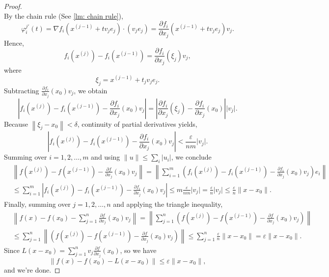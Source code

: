\begin{proof}
\[    \]   
    By the chain rule (See \autoref{lm: chain rule}), 
    \[
        \varphi _i^{j\prime}(t) = \nabla f_i \left( x^{(j-1)} + tv_j e_j \right) \cdot (v_j e_j) = \frac{\partial f_i}{\partial x_j} \left( x^{(j-1)} + tv_j e_j \right)v_j.    
    \]
    Hence, 
    \[
        f_i \left( x^{(j)} \right) - f_i \left( x^{(j-1)} \right) = \frac{\partial f_i}{\partial x_j} \left( \xi_j \right) v_j,    
    \]
    where 
    \[
        \xi_j = x^{(j-1)} + t_j v_j e_j.
    \]
    Subtracting \(\frac{\partial f_i}{\partial x_j} (x_0) v_j \), we obtain
    \[
        \left\vert f_i \left( x^{(j)} \right) - f_i \left( x^{(j-1)} \right) - \frac{\partial f_i}{\partial x_j}(x_0)v_j    \right\vert = \left\vert \frac{\partial f_i}{\partial x_j} \left( \xi_j \right) - \frac{\partial f_i}{\partial x_j}(x_0)    \right\vert  \vert v_j \vert. 
    \] 
    Because \(\left\lVert \xi _j - x_0 \right\rVert < \delta  \), continuity of partial derivatives yields,
    \[
       \left\vert f_i \left( x^{(j)} \right) - f_i \left( x^{(j-1)} \right) - \frac{\partial f_i}{\partial x_j}(x_0)v_j    \right\vert < \frac{\varepsilon }{nm} \vert v_j \vert.  
    \] 
    Summing over \(i = 1, 2,\dots , m\) and using \(\lVert u \rVert \le \sum_{i} \vert u_i \vert   \), we conclude 
    \begin{align*}
        &\left\lVert f \left( x^{(j)} \right) - f \left( x^{(j-1)} \right) - \frac{\partial f}{\partial x_j} (x_0) v_j    \right\rVert = \left\lVert \sum_{i=1}^m \left( f_i \left( x^{(j)} \right) - f_i \left( x^{(j-1)} \right) - \frac{\partial f_i}{\partial x_j} (x_0) v_j  \right) e_i   \right\rVert \\
        &\le \sum_{i=1}^m \left\vert f_i \left( x^{(j)} \right) - f_i \left( x^{(j-1)} \right) - \frac{\partial f_i}{\partial x_j} (x_0) v_j \right\vert \le m \frac{\varepsilon }{nm} \vert v_j \vert = \frac{\varepsilon}{n} \vert v_j \vert \le \frac{\varepsilon}{n} \lVert x - x_0 \rVert.     
    \end{align*}
    Finally, summing over \(j = 1,2,\dots ,n\) and applying the triangle inequality, 
    \begin{align*}
        &\left\lVert f(x) - f(x_0) - \sum_{j=1}^n \frac{\partial f}{\partial x_j} (x_0) v_j   \right\rVert = \left\lVert \sum_{j=1}^n \left( f \left( x^{(j)} \right) - f \left( x^{(j-1)} \right) - \frac{\partial f}{\partial x_j} (x_0) v_j    \right)   \right\rVert \\
        &\le \sum_{j=1}^n \left\lVert \left( f \left( x^{(j)} \right) - f \left( x^{(j-1)} \right) - \frac{\partial f}{\partial x_j} (x_0) v_j    \right) \right\rVert  \le \sum_{j=1}^n \frac{\varepsilon }{n} \lVert x - x_0 \rVert = \varepsilon \lVert x - x_0 \rVert.     
    \end{align*} 
    Since \(L(x - x_0) = \sum_{j=1}^n v_j \frac{\partial f}{\partial x_j} (x_0)  \), so we have 
    \[
        \lVert f(x) - f(x_0) - L(x - x_0) \rVert \le \varepsilon \lVert x - x_0 \rVert,
    \] 
    and we're done.
\end{proof}

